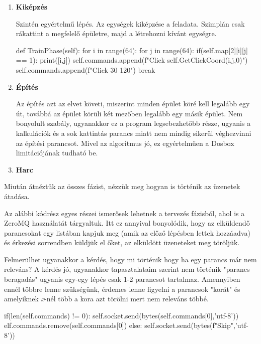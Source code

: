 \begin{enumerate}
    \item \textbf{Kiképzés}
    
Szintén egyértelmű lépés. Az egységek kiképzése a feladata. Szimplán csak rákattint a megfelelő épületre, majd a létrehozni kívánt egységre.
    \begin{python}
def TrainPhase(self):
    for i in range(64):
        for j in range(64):
            if(self.map[2][i][j] == 1):
                print([i,j])
                self.commands.append(f"Click 
                        {self.GetClickCoord(i,j,0)}")
                self.commands.append(f"Click 30 120")
                break
    \end{python}

    \item \textbf{Építés}
    
    Az építés azt az elvet követi, miszerint minden épület köré kell legalább egy út, továbbá az épület körüli két mezőben legalább egy másik épület. Nem bonyolult szabály, ugyanakkor ez a program legsebezhetőbb része, ugyanis a kalkulációk és a sok kattintás parancs miatt nem mindig sikerül véghezvinni az építési parancsot. Mivel az algoritmus jó, ez egyértelműen a Dosbox limitációjának tudható be.

    \item \textbf{Harc}

\end{enumerate}


Miután átnéztük az összes fázist, nézzük meg hogyan is történik az üzenetek átadása.

Az alábbi kódrész egyes részei ismerősek lehetnek a tervezés fázisból, ahol is a ZeroMQ használatát tárgyaltuk. Itt ez annyival bonyolódik, hogy az elküldendő parancsokat egy listában kapjuk meg (amik az előző lépésben lettek hozzáadva) és érkezési sorrendben küldjük el őket, az elküldött üzeneteket meg töröljük.

Felmerülhet ugyanakkor a kérdés, hogy mi történik hogy ha egy parancs már nem releváns? A kérdés jó, ugyanakkor tapasztalataim szerint nem történik "parancs beragadás" ugyanis egy-egy lépés csak 1-2 parancsot tartalmaz. Amennyiben ennél többre lenne szükségünk, érdemes lenne figyelni a parancsok "korát" és amelyiknek \textit{x}-nél több a kora azt törölni mert nem releváns többé.

\begin{python}
if(len(self.commands) != 0):
    self.socket.send(bytes(self.commands[0],'utf-8'))
    elf.commands.remove(self.commands[0])
else:
    self.socket.send(bytes(f"Skip",'utf-8'))
\end{python}

